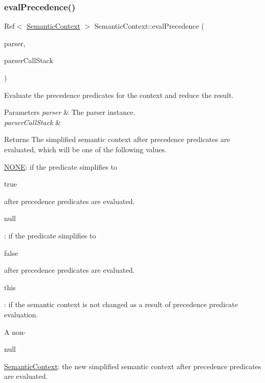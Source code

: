 \subsubsection{\texorpdfstring{eval\+Precedence()}{evalPrecedence()}}
{\footnotesize\ttfamily Ref$<$ \hyperlink{classantlr4_1_1atn_1_1SemanticContext}{Semantic\+Context} $>$ Semantic\+Context\+::eval\+Precedence (\begin{DoxyParamCaption}\item[{\hyperlink{classantlr4_1_1Recognizer}{Recognizer} $\ast$}]{parser,  }\item[{\hyperlink{classantlr4_1_1RuleContext}{Rule\+Context} $\ast$}]{parser\+Call\+Stack }\end{DoxyParamCaption})\hspace{0.3cm}{\ttfamily [virtual]}}

Evaluate the precedence predicates for the context and reduce the result.


\begin{DoxyParams}{Parameters}
{\em parser} & The parser instance. \\
\hline
{\em parser\+Call\+Stack} & \\
\hline
\end{DoxyParams}
\begin{DoxyReturn}{Returns}
The simplified semantic context after precedence predicates are evaluated, which will be one of the following values. 
\begin{DoxyItemize}
\item \hyperlink{classantlr4_1_1atn_1_1SemanticContext_a1c9db994b89d06e9d8969e78050aeff5}{N\+O\+NE}\+: if the predicate simplifies to
\begin{DoxyCode}
\textcolor{keyword}{true} 
\end{DoxyCode}
 after precedence predicates are evaluated. 
\item 
\begin{DoxyCode}
null 
\end{DoxyCode}
 \+: if the predicate simplifies to
\begin{DoxyCode}
\textcolor{keyword}{false} 
\end{DoxyCode}
 after precedence predicates are evaluated. 
\item 
\begin{DoxyCode}
\textcolor{keyword}{this} 
\end{DoxyCode}
 \+: if the semantic context is not changed as a result of precedence predicate evaluation. 
\item A non-\/
\begin{DoxyCode}
null 
\end{DoxyCode}
 \hyperlink{classantlr4_1_1atn_1_1SemanticContext}{Semantic\+Context}\+: the new simplified semantic context after precedence predicates are evaluated. 
\end{DoxyItemize}
\end{DoxyReturn}
\mbox{\label{classantlr4_1_1atn_1_1SemanticContext_ae47c3a65cf405cecabf3f9c109ca6690}} 
